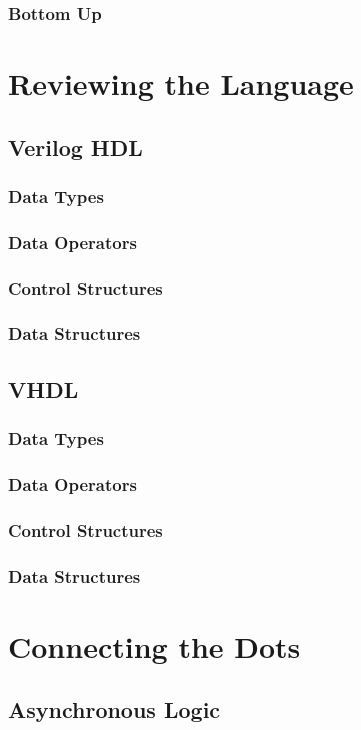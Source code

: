 \documentclass[a4paper,11pt]{book}
\begin{document}
\section{Bottom Up}

\part{Reviewing the Language}
\chapter{Verilog HDL}
\section{Data Types}
\section{Data Operators}
\section{Control Structures}
\section{Data Structures}

\chapter{VHDL}
\section{Data Types}
\section{Data Operators}
\section{Control Structures}
\section{Data Structures}

\part{Connecting the Dots}

\chapter{Asynchronous Logic}
\end{document}
